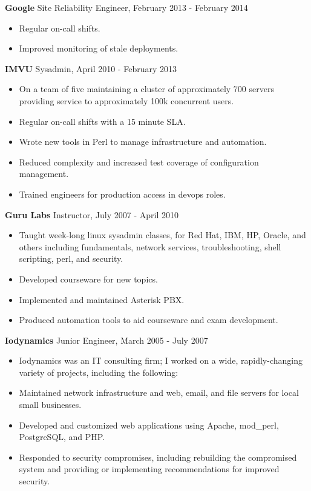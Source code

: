 \documentclass[line]{res}
\begin{document}
\begin{resume}
\textbf{Google} Site Reliability Engineer, February 2013 - February 2014
\begin{itemize}
\item Regular on-call shifts.
\item Improved monitoring of stale deployments.
\end{itemize}

\textbf{IMVU} Sysadmin, April 2010 - February 2013
\begin{itemize}
\item On a team of five maintaining a cluster of approximately 700 servers providing service to approximately 100k concurrent users.
\item Regular on-call shifts with a 15 minute SLA.
\item Wrote new tools in Perl to manage infrastructure and automation.
\item Reduced complexity and increased test coverage of configuration management.
\item Trained engineers for production access in devops roles.
\end{itemize}

\textbf{Guru Labs} Instructor, July 2007 - April 2010
\begin{itemize}
\item Taught week-long linux sysadmin classes, for Red Hat, IBM, HP, Oracle, and others including fundamentals, network services, troubleshooting, shell scripting, perl, and security.
\item Developed courseware for new topics.
\item Implemented and maintained Asterisk PBX.
\item Produced automation tools to aid courseware and exam development.
\end{itemize}

\textbf{Iodynamics} Junior Engineer, March 2005 - July 2007
\begin{itemize}
\item Iodynamics was an IT consulting firm; I worked on a wide, rapidly-changing variety of projects, including the following:
\item Maintained network infrastructure and web, email, and file servers for local small businesses.
\item Developed and customized web applications using Apache, mod\_perl, PostgreSQL, and PHP.
\item Responded to security compromises, including rebuilding the compromised system and providing or implementing recommendations for improved security.
\end{itemize}


\end{resume}
\end{document}
